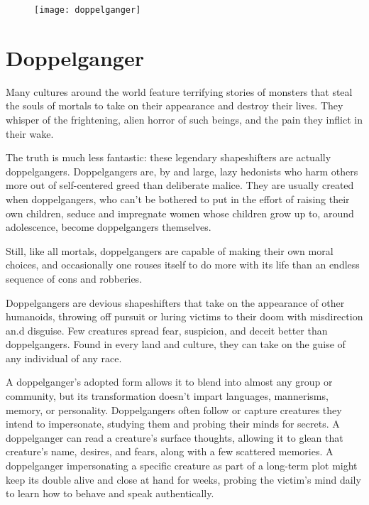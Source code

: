 \begin{figure}[h]
	\texttt{[image: doppelganger]}
\end{figure}
{\vspace{-3em}}

\section{Doppelganger}
\par{Many cultures around the world feature terrifying stories of monsters that steal the souls of mortals to take on their appearance and destroy their lives. They whisper of the frightening, alien horror of such beings, and the pain they inflict in their wake.}
\par{The truth is much less fantastic: these legendary shapeshifters are actually doppelgangers. Doppelgangers are, by and large, lazy hedonists who harm others more out of self-centered greed than deliberate malice. They are usually created when doppelgangers, who can’t be bothered to put in the effort of raising their own children, seduce and impregnate women whose children grow up to, around adolescence, become doppelgangers themselves.}
\par{Still, like all mortals, doppelgangers are capable of making their own moral choices, and occasionally one rouses itself to do more with its life than an endless sequence of cons and robberies.}

Doppelgangers are devious shapeshifters that take on the appearance of other humanoids, throwing off pursuit or luring victims to their doom with misdirection an.d disguise. Few creatures spread fear, suspicion, and deceit better than doppelgangers. Found in every land and culture, they can take on the guise of any individual of any race.

{A doppelganger's adopted form allows it to blend into almost any group or community, but its transformation doesn't impart languages, mannerisms, memory, or personality. Doppelgangers often follow or capture creatures they intend to impersonate, studying them and probing their minds for secrets. A doppelganger can read a creature's surface thoughts, allowing it to glean that creature's name, desires, and fears, along with a few scattered memories. A doppelganger impersonating a specific creature as part of a long-term plot might keep its double alive and close at hand for weeks, probing the victim's mind daily to learn how to behave and speak authentically.}


